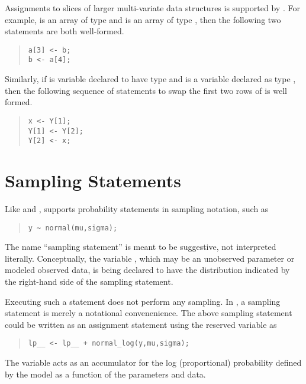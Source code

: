 Assignments to slices of larger multi-variate data structures is
supported by \Stan.  For example,  is an array of type
 and  is an array of type , then
the following two statements are both well-formed.
%
\begin{quote}
\begin{Verbatim}
a[3] <- b;
b <- a[4];
\end{Verbatim}
\end{quote}
%
Similarly, if  is variable declared to have type
 and  is a variable declared as type
, then the following sequence of statements to swap the
first two rows of  is well formed.
%
\begin{quote}
\begin{Verbatim}
x <- Y[1];
Y[1] <- Y[2];
Y[2] <- x;
\end{Verbatim}
\end{quote}

\section{Sampling Statements}

Like \BUGS and \JAGS, \Stan supports probability statements in
sampling notation, such as
%
\begin{quote}
\begin{Verbatim}
y ~ normal(mu,sigma);
\end{Verbatim}
\end{quote}
%
The name ``sampling statement'' is meant to be suggestive, not
interpreted literally.  Conceptually, the variable , which may
be an unobserved parameter or modeled observed data, is being declared
to have the distribution indicated by the right-hand side of the
sampling statement.

Executing such a statement does not perform any sampling.  In \Stan, a
sampling statement is merely a notational convenenience.  The above
sampling statement could be written as an assignment statement using
the reserved variable  as
%
\begin{quote}
\begin{Verbatim}
lp__ <- lp__ + normal_log(y,mu,sigma);
\end{Verbatim}
\end{quote}
%
The variable  acts as an accumulator for the log
(proportional) probability defined by the model as a function of the
parameters and data.

